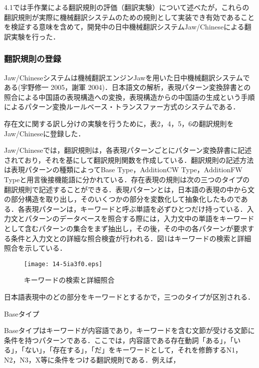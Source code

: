 \documentclass[japanese]{jnlp_1.4}
\begin{document}
4.1では手作業による翻訳規則の評価（翻訳実験）について述べたが，これらの翻訳規則が実際に機械翻訳システムのための規則として実装でき有効であることを検証する意味を含めて，開発中の日中機械翻訳システムJaw/Chineseによる翻訳実験を行った．



\subsubsection{翻訳規則の登録}

Jaw/Chineseシステムは機械翻訳エンジンJawを用いた日中機械翻訳システムである(宇野修一 2005，謝軍 2004)．日本語文の解析，表現パターン変換辞書との照合による中国語の表現構造への変換，表現構造からの中国語の生成という手順によるパターン変換ルールベース・トランスファー方式のシステムである．

存在文に関する訳し分けの実験を行うために，表2，4，5，6の翻訳規則をJaw/Chineseに登録した．

Jaw/Chineseでは，翻訳規則は，各表現パターンごとにパターン変換辞書に記述されており，それを基にして翻訳規則関数を作成している．翻訳規則の記述方法は表現パターンの種類によってBase Type，AdditionCW Type，AdditionFW Typeと用言後接機能語に分かれている．存在表現の規則は次の三つのタイプの翻訳規則で記述することができる．表現パターンとは，日本語の表現の中から文の部分構造を取り出し，そのいくつかの部分を変数化して抽象化したものである．各表現パターンは，キーワードと呼ぶ単語を必ずひとつだけ持っている．入力文とパターンのデータベースを照合する際には，入力文中の単語をキーワードとして含むパターンの集合をまず抽出し，その後，その中の各パターンが要求する条件と入力文との詳細な照合検査が行われる．図1はキーワードの検索と詳細照合を示している．

\begin{figure}[t]
\begin{center}
\texttt{[image: 14-5ia3f0.eps]}
\end{center}
 \caption{キーワードの検索と詳細照合}
\end{figure}
\setcounter{figure}{0}


日本語表現中のどの部分をキーワードとするかで，三つのタイプが区別される．

\noindent
{}Baseタイプ

Baseタイプはキーワードが内容語であり，キーワードを含む文節が受ける文節に条件を持つパターンである．ここでは，内容語である存在動詞「ある」，「いる」，「ない」，「存在する」，「だ」をキーワードとして，それを修飾するN1，N2，N3，X等に条件をつける翻訳規則である．例えば，
\end{document}
